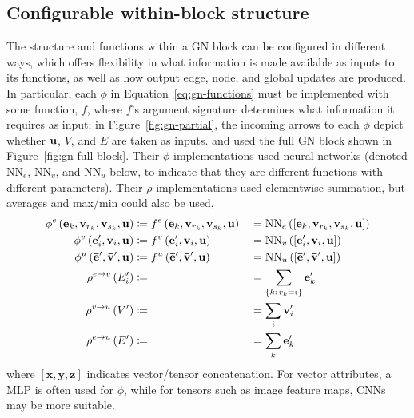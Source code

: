 \subsection{Configurable within-block structure}
\label{sec:dp-configurable}
The structure and functions within a GN block can be configured in different ways, which offers flexibility in what information is made available as inputs to its functions, as well as how output edge, node, and global updates are produced. 
%
In particular, each $\phi$ in Equation~\ref{eq:gn-functions} must be implemented with some function, $f$, where $f$'s argument signature determines what information it requires as input; in Figure~\ref{fig:gn-partial}, the incoming arrows to each $\phi$ depict whether $\mathbf{u}$, $V$, and $E$ are taken as inputs.
%
\cite{hamrick2018relational} and \cite{sanchez2018graph} used the full GN block shown in Figure~\ref{fig:gn-full-block}. Their $\phi$ implementations used neural networks (denoted $\mathrm{NN}_e$, $\mathrm{NN}_v$, and $\mathrm{NN}_u$ below, to indicate that they are different functions with different parameters). Their $\rho$ implementations used  elementwise summation, but averages and max/min could also be used,
\begin{alignat}{3}
    \phi^e\left(\mathbf{e}_k, \mathbf{v}_{r_k}, \mathbf{v}_{s_k}, \mathbf{u}\right) &\coloneqq f^e\left(\mathbf{e}_k, \mathbf{v}_{r_k}, \mathbf{v}_{s_k}, \mathbf{u}\right) &&= \mathrm{NN}_e\left([\mathbf{e}_k, \mathbf{v}_{r_k}, \mathbf{v}_{s_k}, \mathbf{u}]\right) \label{eq:fullgn} \\
    \phi^v\left(\mathbf{\bar{e}}'_i, \mathbf{v}_i, \mathbf{u}\right) &\coloneqq f^v\left(\mathbf{\bar{e}}'_i, \mathbf{v}_i, \mathbf{u}\right) &&= \mathrm{NN}_v \left([\mathbf{\bar{e}}'_i, \mathbf{v}_i, \mathbf{u}]\right) \nonumber\\
    \phi^u \left(\mathbf{\bar{e}}', \mathbf{\bar{v}}', \mathbf{u}\right) &\coloneqq f^u\left(\mathbf{\bar{e}}', \mathbf{\bar{v}}', \mathbf{u}\right) &&= \mathrm{NN}_u\left([\mathbf{\bar{e}}', \mathbf{\bar{v}}', \mathbf{u}]\right) \nonumber\\
    \rho^{e\rightarrow v}\left(E'_i\right) &\coloneqq \; &&= \sum_{\{k:\, r_k=i\}} \mathbf{e}'_k \nonumber \\
    \rho^{v\rightarrow u}\left(V'\right) &\coloneqq \; &&= \sum_i \mathbf{v}'_i \nonumber \\
    \rho^{e\rightarrow u}\left(E'\right) &\coloneqq \; &&= \sum_k \mathbf{e}'_k \nonumber
\end{alignat}
where $[\mathbf{x}, \mathbf{y}, \mathbf{z}]$ indicates vector/tensor concatenation.
%
For vector attributes, a MLP is often used for $\phi$, while for tensors such as image feature maps, CNNs may be more suitable. 

